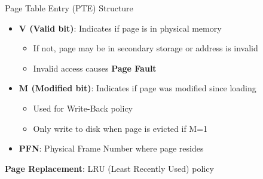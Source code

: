 \documentclass[aspectratio=169,12pt]{beamer}
\begin{document}
\begin{frame}{Page Table Entry (PTE) Structure}
\begin{center}
\end{center}

\vspace{0.5cm}
\begin{itemize}
\item \textbf{V (Valid bit)}: Indicates if page is in physical memory
\begin{itemize}
  \item If not, page may be in secondary storage or address is invalid
  \item Invalid access causes \textbf{Page Fault}
\end{itemize}
\item \textbf{M (Modified bit)}: Indicates if page was modified since loading
\begin{itemize}
  \item Used for Write-Back policy
  \item Only write to disk when page is evicted if M=1
\end{itemize}
\item \textbf{PFN}: Physical Frame Number where page resides
\end{itemize}

\vspace{0.3cm}
\textbf{Page Replacement}: LRU (Least Recently Used) policy
\end{frame}
\end{document}
